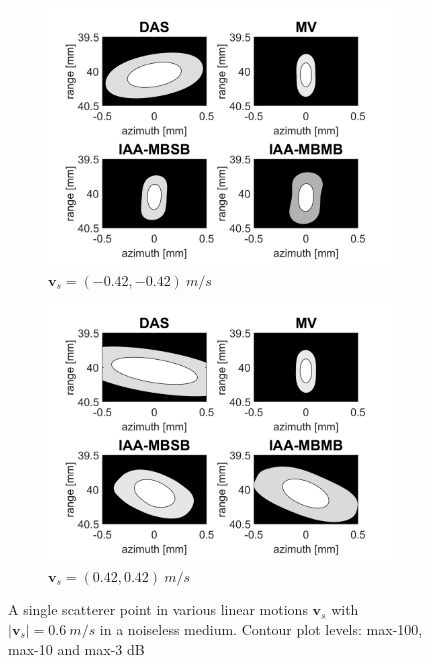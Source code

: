 \begin{figure}[ht]
\begin{subfigure}[t]{0.48\linewidth}
        \includegraphics[width=\linewidth]{./images/results/2.1/motion_45_-06.png}
        \caption{$\boldsymbol{v}_s = (-0.42, -0.42)~m/s$}
    \end{subfigure}
    \quad
    \begin{subfigure}[t]{0.48\linewidth}
        \includegraphics[width=\linewidth]{./images/results/2.1/motion_45_06.png}
        \caption{$\boldsymbol{v}_s = (0.42, 0.42)~m/s$}
    \end{subfigure}
	\caption{A single scatterer point in various linear motions $\boldsymbol{v}_s$ with $|\boldsymbol{v}_s|=0.6~m/s$ in a noiseless medium. Contour plot levels: max-100, max-10 and max-3 dB}
	\label{fig:linear_motion}
\end{figure}



